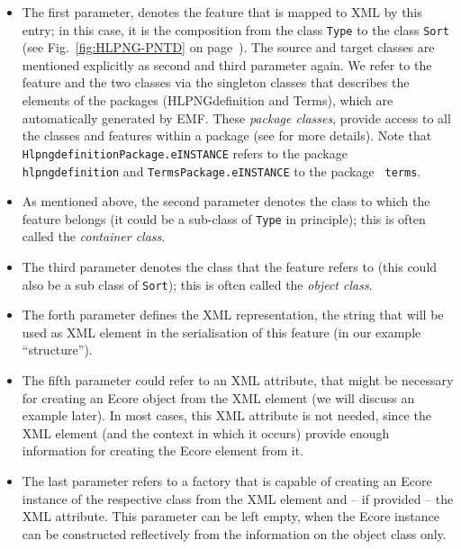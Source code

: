 \begin{itemize}
  \item The first parameter, denotes the feature that is mapped to XML by this
        entry; in this case, it is the composition from the class {\tt Type} to
        the class {\tt Sort} (see Fig.~\ref{fig:HLPNG-PNTD} on
        page~\pageref{fig:HLPNG-PNTD}). The source and target classes are
        mentioned explicitly as second and third parameter again. We refer to
        the feature and the two classes via the singleton classes that describes
        the elements of the packages (HLPNGdefinition and Terms), which
        are automatically generated by EMF. These
        \emph{package classes},%
        provide access to all the classes and features
        within a package (see \cite{BSM06} for more details). Note that {\tt
        HlpngdefinitionPackage.eINSTANCE} refers to the package {\tt
        hlpngdefinition} and {\tt TermsPackage.eINSTANCE} to the package {\tt
        terms}.
        
  \item As mentioned above, the second parameter denotes the class to
        which the feature belongs (it could be a sub-class of {\tt Type}
        in principle); this is often called the \emph{container class}.%
        
  \item The third parameter denotes the class that the feature refers to
        (this could also be a sub class of {\tt Sort}); this is often called the
        \emph{object class}.%
        
  \item The forth parameter defines the XML representation, the string
        that will be used as XML element in the serialisation of this
        feature (in our example ``structure'').
        
  \item The fifth parameter could refer to an XML attribute, that might
        be necessary for creating an Ecore object from the XML element
        (we will discuss an example later). In most cases, this XML attribute
        is not needed, since the XML element (and the context in which it
        occurs) provide enough information for creating the Ecore element from
        it.
        
  \item The last parameter refers to a factory that is capable of creating
        an Ecore instance of the respective class from the XML element
        and -- if provided -- the XML attribute. This parameter can
        be left empty, when the Ecore instance can be constructed reflectively
        from the information on the object class only.   
\end{itemize}

